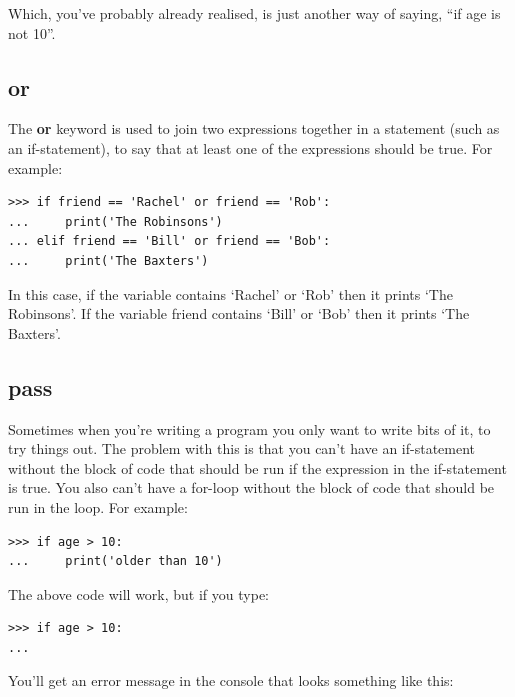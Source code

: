 \noindent
Which, you've probably already realised, is just another way of saying, ``if age is not 10''.

\subsection*{or}

The \textbf{or} keyword is used to join two expressions together in a statement (such as an if-statement), to say that at least one of the expressions should be true.  For example:

\begin{listingignore}
\begin{verbatim}
>>> if friend == 'Rachel' or friend == 'Rob':
...     print('The Robinsons')
... elif friend == 'Bill' or friend == 'Bob':
...     print('The Baxters')
\end{verbatim}
\end{listingignore}

In this case, if the variable  contains `Rachel' or `Rob' then it prints `The Robinsons'.  If the variable friend contains `Bill' or `Bob' then it prints `The Baxters'.

\subsection*{pass}

Sometimes when you're writing a program you only want to write bits of it, to try things out.  The problem with this is that you can't have an if-statement without the block of code that should be run if the expression in the if-statement is true. You also can't have a for-loop without the block of code that should be run in the loop. For example:

\begin{listing}
\begin{verbatim}
>>> if age > 10:
...     print('older than 10')
\end{verbatim}
\end{listing}

\noindent
The above code will work, but if you type:

\begin{listingignore}
\begin{verbatim}
>>> if age > 10:
...
\end{verbatim}
\end{listingignore}

\noindent
You'll get an error message in the console that looks something like this:

